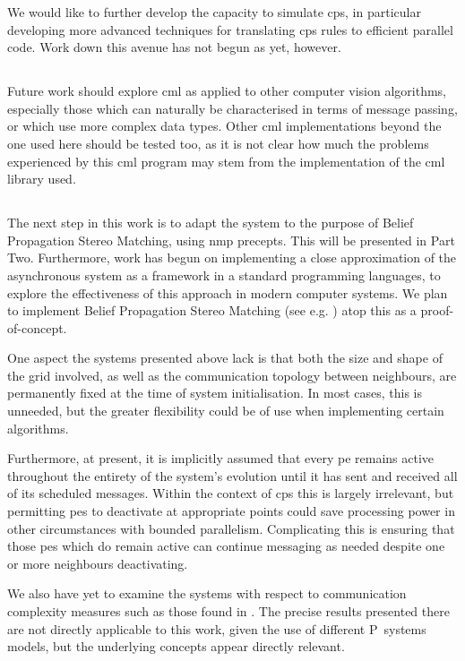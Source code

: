 We would like to further develop the capacity to simulate \gls{cps}, in particular developing more advanced techniques for translating \gls{cps} rules to efficient parallel code.  Work down this avenue has not begun as yet, however.


\subsection{}

Future work should explore \gls{cml} as applied to other computer vision algorithms, especially those which can naturally be characterised in terms of message passing, or which use more complex data types.  Other \gls{cml} implementations beyond the one used here should be tested too, as it is not clear how much the problems experienced by this \gls{cml} program may stem from the implementation of the \gls{cml} library used.


\subsection{}
The next step in this work is to adapt the system to the purpose of Belief Propagation Stereo Matching, using \gls{nmp} precepts.  This will be presented in Part Two.  Furthermore, work has begun on implementing a close approximation of the asynchronous system as a framework in a standard programming languages, to explore the effectiveness of this approach in modern computer systems.  We plan to implement Belief Propagation Stereo Matching (see e.g. \cite{Blake2011,Felzenszwalb2011,JianSun2003}) atop this as a proof-of-concept.

One aspect the systems presented above lack is that both the size and shape of the grid involved, as well as the communication topology between neighbours, are permanently fixed at the time of system initialisation.  In most cases, this is unneeded, but the greater flexibility could be of use when implementing certain algorithms.

Furthermore, at present, it is implicitly assumed that every \gls{pe} remains active throughout the entirety of the system's evolution until it has sent and received all of its scheduled messages.  Within the context of \gls{cps} this is largely irrelevant, but permitting \glspl{pe} to deactivate at appropriate points could save processing power in other circumstances with bounded parallelism.  Complicating this is ensuring that those \glspl{pe} which do remain active can continue messaging as needed despite one or more neighbours deactivating.

We also have yet to examine the systems with respect to communication complexity measures such as those found in \cite{Juayong2020}.  The precise results presented there are not directly applicable to this work, given the use of different P~systems models, but the underlying concepts appear directly relevant.

